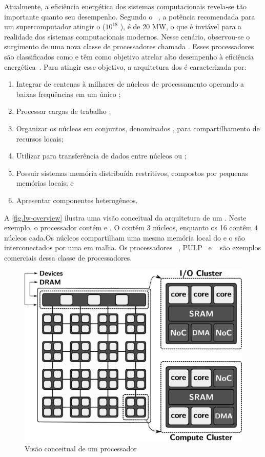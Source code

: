 Atualmente, a eficiência energética dos sistemas computacionais revela-se tão importante quanto seu desempenho. Segundo o \darpa~\cite{darpa:exascale}, a potência recomendada para um supercomputador atingir o \exascale ($10^{18}$ \flops), é de 20 MW, o que é inviável para a realidade dos sistemas computacionais modernos. Nesse cenário, observou-se o surgimento de uma nova classe de processadores chamada \lw. Esses processadores são classificados como \mpsocs e têm como objetivo atrelar alto desempenho à eficiência energética~\cite{francesquini2015}. Para atingir esse objetivo, a arquitetura dos \lws é caracterizada por:
\begin{enumerate}[label=(\roman*)]
    \item Integrar de centenas à milhares de núcleos de processamento operando a baixas frequências em um único \chip;
    \item Processar cargas de trabalho \mimd;
    \item Organizar os núcleos em conjuntos, denominados \clusters, para compartilhamento de recursos locais;
    \item Utilizar \nocs para transferência de dados entre núcleos ou \clusters;
    \item Possuir sistemas memória distribuída restritivos, compostos por pequenas memórias locais; e
    \item Apresentar componentes heterogêneos.
\end{enumerate}
A \autoref{fig.lw-overview} ilustra uma visão conceitual da arquitetura de um \lw. Neste exemplo, o processador contém \ioclusters e \cclusters. O \iocluster contém 3 núcleos, enquanto os 16 \cclusters contêm 4 núcleos cada.Os núcleos compartilham uma mesma memória local do \cluster e o \clusters são interconectados por uma \noc em malha. Os processadores \mppa~\cite{dinechin:2013}, PULP~\cite{pulp} e \taihulight~\cite{fu2016sunway} são exemplos comerciais dessa classe de processadores.

\begin{figure}[t]
	\centering
	\includegraphics[width=0.5\linewidth]{content/images/lw-overview-gs.jpg}
	\caption{Visão conceitual de um processador \lw}
    \label{fig.lw-overview}
\end{figure}

